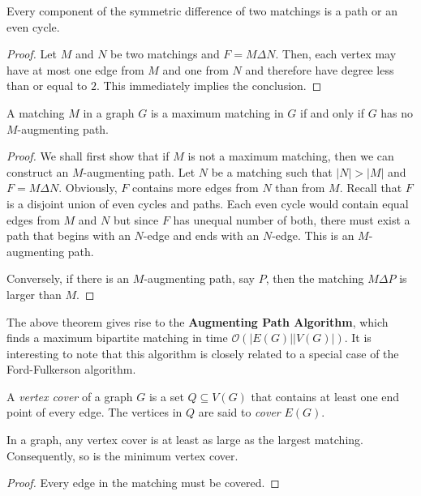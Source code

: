 \begin{lemma}
    Every component of the symmetric difference of two matchings is a path or an even cycle.
\end{lemma}
\begin{proof}
    Let $M$ and $N$ be two matchings and $F = M\Delta N$. Then, each vertex may have at most one edge from $M$ and one from $N$ and therefore have degree less than or equal to $2$. This immediately implies the conclusion.
\end{proof}

\begin{theorem}[Berge, 1957]
    A matching $M$ in a graph $G$ is a maximum matching in $G$ if and only if $G$ has no $M$-augmenting path.
\end{theorem}
\begin{proof}
    We shall first show that if $M$ is not a maximum matching, then we can construct an $M$-augmenting path. Let $N$ be a matching such that $|N| > |M|$ and $F = M\Delta N$. Obviously, $F$ contains more edges from $N$ than from $M$. Recall that $F$ is a disjoint union of even cycles and paths. Each even cycle would contain equal edges from $M$ and $N$ but since $F$ has unequal number of both, there must exist a path that begins with an $N$-edge and ends with an $N$-edge. This is an $M$-augmenting path.

    Conversely, if there is an $M$-augmenting path, say $P$, then the matching $M\Delta P$ is larger than $M$.
\end{proof}

The above theorem gives rise to the \textbf{Augmenting Path Algorithm}, which finds a maximum bipartite matching in time $\mathcal{O}(|E(G)||V(G)|)$. It is interesting to note that this algorithm is closely related to a special case of the Ford-Fulkerson algorithm.

\begin{definition}
    A \textit{vertex cover} of a graph $G$ is a set $Q\subseteq V(G)$ that contains at least one end point of every edge. The vertices in $Q$ are said to \textit{cover} $E(G)$.
\end{definition}

\begin{lemma}
    In a graph, any vertex cover is at least as large as the largest matching. Consequently, so is the minimum vertex cover.
\end{lemma}
\begin{proof}
    Every edge in the matching must be covered.
\end{proof}

